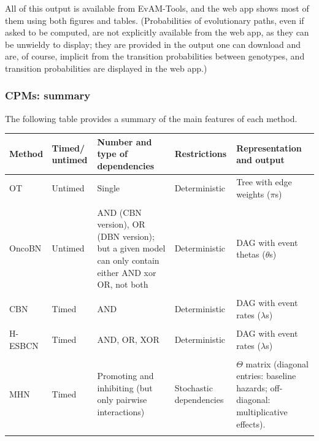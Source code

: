 \documentclass[a4paper,11pt]{article}
\begin{document}
All of this output is available from EvAM-Tools, and the web app shows most of them using both figures and tables. (Probabilities of evolutionary paths, even if asked to be computed, are not explicitly available from the web app, as they can be unwieldy to display; they are provided in the output one can download and are, of course, implicit from the transition probabilities between genotypes, and transition probabilities are displayed in the web app.)

\subsubsection{CPMs: summary}\label{cpmtable}

The following table provides a summary of the main features of each method.\\


\begin{flushleft}
\begin{tabular}{l p{1.5cm} p{4cm} p{2.2cm} p{4cm}}
  \hline
  Method & Timed/
           untimed & Number and type of dependencies & Restrictions & Representation and output\\
  \hline

  OT & Untimed & Single & Deterministic & Tree with edge weights ($\pi$s) \\
  \\
  OncoBN & Untimed & AND (CBN version), OR (DBN version); 
                     but a given model can only contain either
                     AND xor OR, not both & Deterministic & DAG with event thetas ($\theta$s)\\
  \\
  CBN & Timed  & AND & Deterministic & DAG with event rates ($\lambda$s)\\
\\
  H-ESBCN & Timed & AND, OR, XOR & Deterministic & DAG with event rates ($\lambda$s)\\
\\
  MHN & Timed & Promoting and inhibiting (but only pairwise interactions) & Stochastic dependencies & $\Theta$ matrix (diagonal entries: baseline hazards; off-diagonal: multiplicative effects).\\

  \hline\\

  
\end{tabular}
\end{flushleft}
\end{document}
